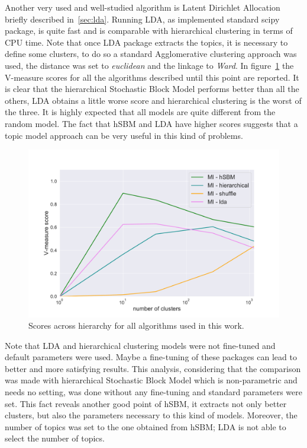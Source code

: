 \FloatBarrier
Another very used and well-studied algorithm is Latent Dirichlet Allocation briefly described in~\ref{sec:lda}. Running LDA, as implemented standard scipy package, is quite fast and is comparable with hierarchical clustering in terms of CPU time. Note that once LDA package extracts the topics, it is necessary to define some clusters, to do so a standard Agglomerative clustering approach was used, the distance was set to \textit{euclidean} and the linkage to \textit{Ward}. In figure~\ref{fig:topic/gtex/oversigma_10tissue/metric_scores_all} the V-measure scores for all the algorithms described until this point are reported. It is clear that the hierarchical Stochastic Block Model performs better than all the others, LDA obtains a little worse score and hierarchical clustering is the worst of the three. It is highly expected that all models are quite different from the random model. The fact that hSBM and LDA have higher scores suggests that a topic model approach can be very useful in this kind of problems. 
\begin{figure}[htb!]
    \centering
    \includegraphics[width=0.9\linewidth]{pictures/topic/gtex/oversigma_10tissue/metric_scores_all.pdf}
    \caption{Scores across hierarchy for all algorithms used in this work.}
    \label{fig:topic/gtex/oversigma_10tissue/metric_scores_all}
\end{figure}
Note that LDA and hierarchical clustering models were not fine-tuned and default parameters were used. Maybe a fine-tuning of these packages can lead to better and more satisfying results. This analysis, considering that the comparison was made with hierarchical Stochastic Block Model which is non-parametric and needs no setting, was done without any fine-tuning and standard parameters were set. This fact reveals another good point of hSBM, it extracts not only better clusters, but also the parameters necessary to this kind of models. Moreover, the number of topics was set to the one obtained from hSBM; LDA is not able to select the number of topics.

